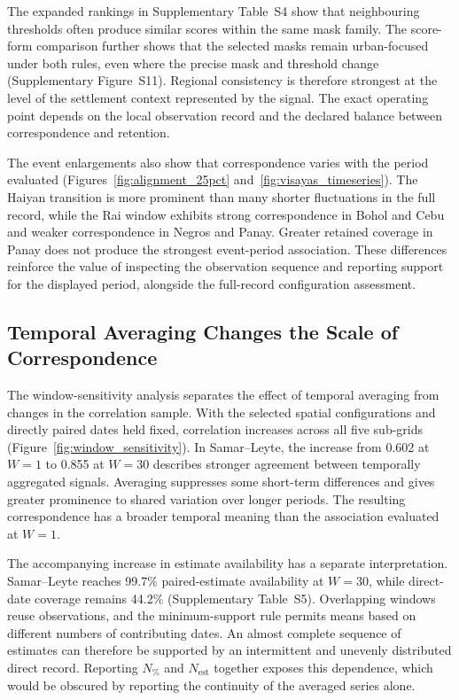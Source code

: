 \documentclass[]{interact}
\theoremstyle{plain}%
\theoremstyle{definition}
\theoremstyle{remark}
\begin{document}
        The expanded rankings in Supplementary Table~S4 show that neighbouring thresholds often produce similar scores within the same mask family. The score-form comparison further shows that the selected masks remain urban-focused under both rules, even where the precise mask and threshold change (Supplementary Figure~S11). Regional consistency is therefore strongest at the level of the settlement context represented by the signal. The exact operating point depends on the local observation record and the declared balance between correspondence and retention.
        
        The event enlargements also show that correspondence varies with the period evaluated (Figures~\ref{fig:alignment_25pct} and~\ref{fig:visayas_timeseries}). The Haiyan transition is more prominent than many shorter fluctuations in the full record, while the Rai window exhibits strong correspondence in Bohol and Cebu and weaker correspondence in Negros and Panay. Greater retained coverage in Panay does not produce the strongest event-period association. These differences reinforce the value of inspecting the observation sequence and reporting support for the displayed period, alongside the full-record configuration assessment.
    
    \subsection{Temporal Averaging Changes the Scale of Correspondence}
    
        The window-sensitivity analysis separates the effect of temporal averaging from changes in the correlation sample. With the selected spatial configurations and directly paired dates held fixed, correlation increases across all five sub-grids (Figure~\ref{fig:window_sensitivity}). In Samar--Leyte, the increase from 0.602 at $W=1$ to 0.855 at $W=30$ describes stronger agreement between temporally aggregated signals. Averaging suppresses some short-term differences and gives greater prominence to shared variation over longer periods. The resulting correspondence has a broader temporal meaning than the association evaluated at $W=1$.
        
        The accompanying increase in estimate availability has a separate interpretation. Samar--Leyte reaches 99.7\% paired-estimate availability at $W=30$, while direct-date coverage remains 44.2\% (Supplementary Table~S5). Overlapping windows reuse observations, and the minimum-support rule permits means based on different numbers of contributing dates. An almost complete sequence of estimates can therefore be supported by an intermittent and unevenly distributed direct record. Reporting $N_{\%}$ and $N_{\mathrm{est}}$ together exposes this dependence, which would be obscured by reporting the continuity of the averaged series alone.
        
\end{document}
